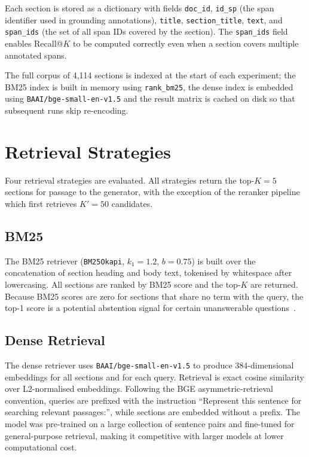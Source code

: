 Each section is stored as a dictionary with fields \texttt{doc\_id},
\texttt{id\_sp} (the span identifier used in grounding annotations),
\texttt{title}, \texttt{section\_title}, \texttt{text}, and
\texttt{span\_ids} (the set of all span IDs covered by the section). The
\texttt{span\_ids} field enables Recall@$K$ to be computed correctly even when a
section covers multiple annotated spans.

The full corpus of 4{,}114 sections is indexed at the start of each experiment;
the BM25 index is built in memory using \texttt{rank\_bm25}, the dense index is
embedded using \texttt{BAAI/bge-small-en-v1.5} and the result matrix is cached
on disk so that subsequent runs skip re-encoding.


\section{Retrieval Strategies}\label{sec:rag:retrieval}

Four retrieval strategies are evaluated. All strategies return the top-$K = 5$
sections for passage to the generator, with the exception of the reranker pipeline
which first retrieves $K' = 50$ candidates.

\subsection{BM25}

The BM25 retriever (\texttt{BM25Okapi}, $k_1 = 1.2$, $b = 0.75$) is built over
the concatenation of section heading and body text, tokenised by whitespace after
lowercasing. All sections are ranked by BM25 score and the top-$K$ are returned.
Because BM25 scores are zero for sections that share no term with the query,
the top-1 score is a potential abstention signal for certain unanswerable
questions~\cite{robertson2009bm25}.

\subsection{Dense Retrieval}

The dense retriever uses \texttt{BAAI/bge-small-en-v1.5} to produce 384-dimensional
embeddings for all sections and for each query. Retrieval is exact cosine similarity
over L2-normalised embeddings. Following the BGE asymmetric-retrieval convention,
queries are prefixed with the instruction ``Represent this sentence for searching
relevant passages:'', while sections are embedded without a prefix.
The model was pre-trained on a large collection of sentence pairs and fine-tuned for
general-purpose retrieval, making it competitive with larger models at lower
computational cost.

